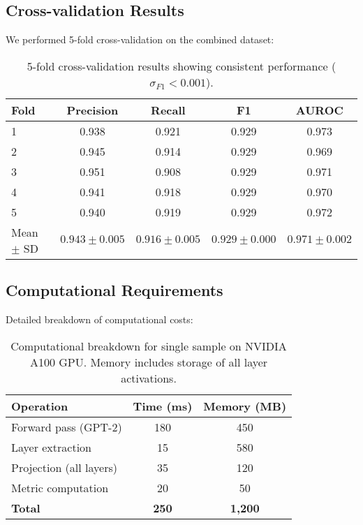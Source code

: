 \documentclass[11pt]{article}
\begin{document}
\subsection{Cross-validation Results}

We performed 5-fold cross-validation on the combined dataset:

\begin{table}[h]
\centering
\small
\begin{tabular}{lcccc}
\toprule
\textbf{Fold} & \textbf{Precision} & \textbf{Recall} & \textbf{F1} & \textbf{AUROC} \\
\midrule
1 & 0.938 & 0.921 & 0.929 & 0.973 \\
2 & 0.945 & 0.914 & 0.929 & 0.969 \\
3 & 0.951 & 0.908 & 0.929 & 0.971 \\
4 & 0.941 & 0.918 & 0.929 & 0.970 \\
5 & 0.940 & 0.919 & 0.929 & 0.972 \\
\midrule
Mean $\pm$ SD & $0.943 \pm 0.005$ & $0.916 \pm 0.005$ & $\mathbf{0.929 \pm 0.000}$ & $0.971 \pm 0.002$ \\
\bottomrule
\end{tabular}
\caption{5-fold cross-validation results showing consistent performance ($\sigma_{F1} < 0.001$).}
\end{table}

\subsection{Computational Requirements}

Detailed breakdown of computational costs:

\begin{table}[h]
\centering
\small
\begin{tabular}{lcc}
\toprule
\textbf{Operation} & \textbf{Time (ms)} & \textbf{Memory (MB)} \\
\midrule
Forward pass (GPT-2) & 180 & 450 \\
Layer extraction & 15 & 580 \\
Projection (all layers) & 35 & 120 \\
Metric computation & 20 & 50 \\
\midrule
\textbf{Total} & \textbf{250} & \textbf{1,200} \\
\bottomrule
\end{tabular}
\caption{Computational breakdown for single sample on NVIDIA A100 GPU. Memory includes storage of all layer activations.}
\end{table}
\end{document}
